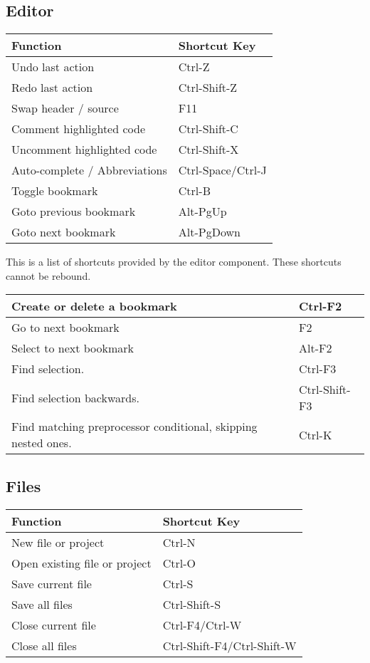 \subsection{Editor}

\begin{tabular}{|l|l|}\hline
Function		&	Shortcut Key\\ \hline
Undo last action 	&	Ctrl-Z\\ \hline
Redo last action 	&	Ctrl-Shift-Z\\ \hline
Swap header / source 	&	F11\\ \hline
Comment highlighted code &	Ctrl-Shift-C\\ \hline
Uncomment highlighted code & 	Ctrl-Shift-X\\ \hline
Auto-complete / Abbreviations & 	Ctrl-Space/Ctrl-J\\ \hline
Toggle bookmark 	&	Ctrl-B\\ \hline
Goto previous bookmark 	&	Alt-PgUp\\ \hline
Goto next bookmark 	&	Alt-PgDown\\ \hline
\end{tabular}

This is a list of shortcuts provided by the \codeblocks editor component. These shortcuts cannot be rebound.

\begin{tabular}{|l|l|}\hline
Create or delete a bookmark	&	Ctrl-F2\\ \hline
Go to next bookmark		&	F2\\ \hline
Select to next bookmark		&	Alt-F2\\ \hline
Find selection.			& 	Ctrl-F3\\ \hline
Find selection backwards. 	&	Ctrl-Shift-F3\\ \hline
Find matching preprocessor conditional, skipping nested ones. &	Ctrl-K\\ \hline
\end{tabular}

\subsection{Files}

\begin{tabular}{|l|l|}\hline
Function 		&	Shortcut Key\\ \hline
New file or project 	&	Ctrl-N\\ \hline
Open existing file or project &	Ctrl-O\\ \hline
Save current file 	&	Ctrl-S\\ \hline
Save all files 		&	Ctrl-Shift-S\\ \hline
Close current file 	&	Ctrl-F4/Ctrl-W\\ \hline
Close all files 	&	Ctrl-Shift-F4/Ctrl-Shift-W\\ \hline
\end{tabular}

